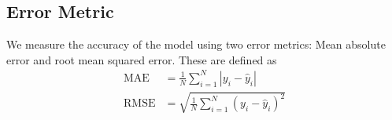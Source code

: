 \subsection{Error Metric}
We measure the accuracy of the model using two error metrics:
Mean absolute error and root mean squared error.
These are defined as
\begin{align}
  \text{MAE} &= \frac{1}{N}\sum_{i=1}^N\left|y_i - \hat{y}_i\right|\\
  \text{RMSE} &= \sqrt{\frac{1}{N}\sum_{i=1}^N\left(y_i - \hat{y}_i\right)^2}
\end{align}
